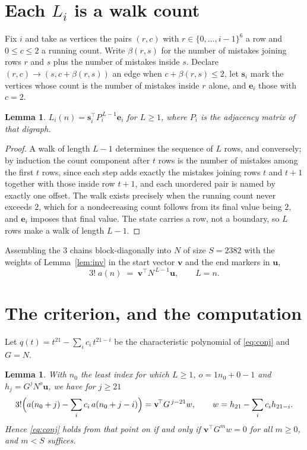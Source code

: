 \documentclass[11pt,a4paper]{article}
\theoremstyle{plain}
\newtheorem{lemma}[theorem]{Lemma}
\theoremstyle{definition}
\begin{document}
\section{Each $L_i$ is a walk count}

Fix $i$ and take as vertices the pairs $(r,c)$ with $r\in\{0,\dots,i-1\}^{6}$ a row
and $0\le c\le2$ a running count. Write $\beta(r,s)$ for the number of mistakes joining
rows $r$ and $s$ plus the number of mistakes inside $s$. Declare $(r,c)\to(s,c+\beta(r,s))$
an edge when $c+\beta(r,s)\le2$, let $\mathbf{s}_i$ mark the vertices whose count is the
number of mistakes inside $r$ alone, and $\mathbf{e}_i$ those with $c=2$.

\begin{lemma}\label{lem:walk}
$L_i(n)=\mathbf{s}_i^{\!\top}P_i^{\,L-1}\mathbf{e}_i$ for $L\ge1$, where $P_i$ is the
adjacency matrix of that digraph.
\end{lemma}

\begin{proof}
A walk of length $L-1$ determines the sequence of $L$ rows, and conversely; by induction
the count component after $t$ rows is the number of mistakes among the first $t$ rows,
since each step adds exactly the mistakes joining rows $t$ and $t+1$ together with those
inside row $t+1$, and each unordered pair is named by exactly one offset. The walk exists
precisely when the running count never exceeds $2$, which for a nondecreasing count follows
from its final value being $2$, and $\mathbf{e}_i$ imposes that final value. The state
carries a row, not a boundary, so $L$ rows make a walk of length $L-1$.
\end{proof}

Assembling the $3$ chains block-diagonally into $N$ of size $S=2382$ with the weights of
Lemma~\ref{lem:inv} in the start vector $\mathbf{v}$ and the end markers in
$\mathbf{u}$,
\begin{equation}\label{eq:walk2}
3!\;a(n)\;=\;\mathbf{v}^{\!\top}N^{\,L-1}\mathbf{u},\qquad L=n .
\end{equation}

\section{The criterion, and the computation}

Let $q(t)=t^{21}-\sum_i c_i\,t^{21-i}$ be the characteristic polynomial of
\eqref{eq:conj} and $G=N$.

\begin{lemma}\label{lem:crit}
With $n_0$ the least index for which $L\ge1$, $o=1n_0+0-1$ and
$h_j=G^{j}N^{o}\mathbf{u}$, we have for $j\ge21$
\[
3!\Bigl(a(n_0+j)-\sum_i c_i\,a(n_0+j-i)\Bigr)=\mathbf{v}^{\!\top}G^{\,j-21}w,
\qquad w=h_{21}-\sum_i c_ih_{21-i} .
\]
Hence \eqref{eq:conj} holds from that point on if and only if
$\mathbf{v}^{\!\top}G^{m}w=0$ for all $m\ge0$, and $m<S$ suffices.
\end{lemma}
\end{document}
